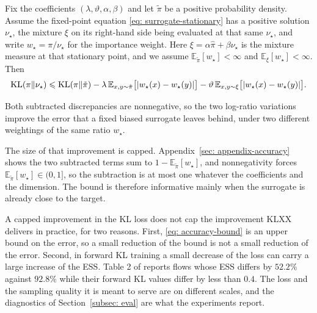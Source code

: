 \documentclass{article}
\begin{document}
\begin{theorem}
\label{thm: accuracy}
Fix the coefficients $(\lambda,\vartheta,\alpha,\beta)$ and let $\tilde\pi$ be a positive probability density. Assume the fixed-point equation \eqref{eq: surrogate-stationary} has a positive solution $\nu_\star$, the mixture $\xi$ on its right-hand side being evaluated at that same $\nu_\star$, and write $w_\star = \pi/\nu_\star$ for the importance weight. Here $\xi=\alpha\hat\pi+\beta\nu_\star$ is the mixture measure at that stationary point, and we assume $\mathbb E_{\tilde\pi}[w_\star]<\infty$ and $\mathbb E_{\xi}[w_\star]<\infty$. Then
\begin{equation}
	\mathrm{KL}(\pi\|\nu_\star) \leqslant \mathrm{KL}(\pi\|\tilde\pi)
	- \lambda\,\mathbb E_{x,y\sim\tilde\pi}\bigl[|w_\star(x)-w_\star(y)|\bigr]
	- \vartheta\,\mathbb E_{x,y\sim\xi}\bigl[|w_\star(x)-w_\star(y)|\bigr] .
	\label{eq: accuracy-bound}
\end{equation}
\end{theorem}
Both subtracted discrepancies are nonnegative, so the two log-ratio variations improve the error that a fixed biased surrogate leaves behind, under two different weightings of the same ratio $w_\star$.

The size of that improvement is capped. Appendix~\ref{sec: appendix-accuracy} shows the two subtracted terms sum to $1-\mathbb E_{\tilde\pi}[w_\star]$, and nonnegativity forces $\mathbb E_{\tilde\pi}[w_\star]\in(0,1]$, so the subtraction is at most one whatever the coefficients and the dimension. The bound is therefore informative mainly when the surrogate is already close to the target. 

\begin{remark}
	A capped improvement in the KL loss does not cap the improvement KLXX delivers in practice, for two reasons. First, \eqref{eq: accuracy-bound} is an upper bound on the error, so a small reduction of the bound is not a small reduction of the error. Second, in forward KL training a small decrease of the loss can carry a large increase of the ESS. Table 2 of \citet{midgley2022flow} reports flows whose ESS differs by $52.2\%$ against $92.8\%$ while their forward KL values differ by less than $0.4$. The loss and the sampling quality it is meant to serve are on different scales, and the diagnostics of Section~\ref{subsec: eval} are what the experiments report.
\end{remark}
\end{document}

